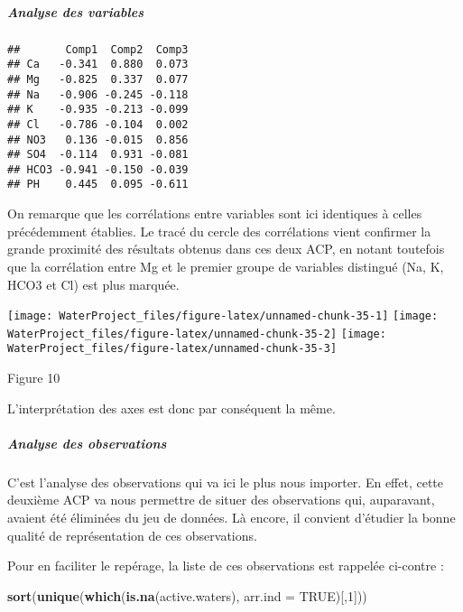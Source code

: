 \documentclass[]{article}
\newenvironment{Shaded}{\begin{snugshade}}{\end{snugshade}}
\newcommand{\KeywordTok}[1]{\textcolor[rgb]{0.13,0.29,0.53}{\textbf{#1}}}
\newcommand{\DataTypeTok}[1]{\textcolor[rgb]{0.13,0.29,0.53}{#1}}
\newcommand{\DecValTok}[1]{\textcolor[rgb]{0.00,0.00,0.81}{#1}}
\newcommand{\OtherTok}[1]{\textcolor[rgb]{0.56,0.35,0.01}{#1}}
\newcommand{\OperatorTok}[1]{\textcolor[rgb]{0.81,0.36,0.00}{\textbf{#1}}}
\newcommand{\NormalTok}[1]{#1}
\let\oldsubparagraph\subparagraph
\renewcommand{\subparagraph}[1]{\oldsubparagraph{#1}\mbox{}}
\begin{document}
\subparagraph{Analyse des variables}\label{analyse-des-variables-1}

\begin{Shaded}
\end{Shaded}

\begin{verbatim}
##       Comp1  Comp2  Comp3
## Ca   -0.341  0.880  0.073
## Mg   -0.825  0.337  0.077
## Na   -0.906 -0.245 -0.118
## K    -0.935 -0.213 -0.099
## Cl   -0.786 -0.104  0.002
## NO3   0.136 -0.015  0.856
## SO4  -0.114  0.931 -0.081
## HCO3 -0.941 -0.150 -0.039
## PH    0.445  0.095 -0.611
\end{verbatim}

On remarque que les corrélations entre variables sont ici identiques à
celles précédemment établies. Le tracé du cercle des corrélations vient
confirmer la grande proximité des résultats obtenus dans ces deux ACP,
en notant toutefois que la corrélation entre Mg et le premier groupe de
variables distingué (Na, K, HCO3 et Cl) est plus marquée.

\texttt{[image: WaterProject\_files/figure-latex/unnamed-chunk-35-1]}
\texttt{[image: WaterProject\_files/figure-latex/unnamed-chunk-35-2]}
\texttt{[image: WaterProject\_files/figure-latex/unnamed-chunk-35-3]}

Figure 10

L'interprétation des axes est donc par conséquent la même.

\subparagraph{Analyse des
observations}\label{analyse-des-observations-1}

C'est l'analyse des observations qui va ici le plus nous importer. En
effet, cette deuxième ACP va nous permettre de situer des observations
qui, auparavant, avaient été éliminées du jeu de données. Là encore, il
convient d'étudier la bonne qualité de représentation de ces
observations.

Pour en faciliter le repérage, la liste de ces observations est rappelée
ci-contre :

\begin{Shaded}
\begin{Highlighting}[]
\KeywordTok{sort}\NormalTok{(}\KeywordTok{unique}\NormalTok{(}\KeywordTok{which}\NormalTok{(}\KeywordTok{is.na}\NormalTok{(active.waters), }\DataTypeTok{arr.ind =} \OtherTok{TRUE}\NormalTok{)[,}\DecValTok{1}\NormalTok{]))}
\end{Highlighting}
\end{Shaded}
\end{document}

